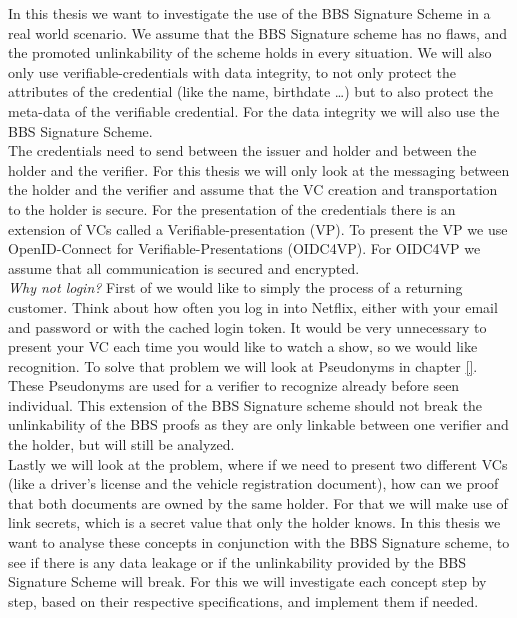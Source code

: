 \documentclass[
	a4paper               %
	,bibliography=totoc   %
	,listof=totoc         %
	,monolingual
]{bfhthesis}              %
\begin{document}
In this thesis we want to investigate the use of the BBS Signature Scheme in a real world scenario.
We assume that the BBS Signature scheme has no flaws, and the promoted unlinkability of the scheme holds in every situation.
We will also only use verifiable-credentials with data integrity, to not only protect the attributes of the credential (like the name, birthdate \dots) but to also protect the meta-data of the verifiable credential.
For the data integrity we will also use the BBS Signature Scheme.\\

The credentials need to send between the issuer and holder and between the holder and the verifier.
For this thesis we will only look at the messaging between the holder and the verifier and assume that the VC creation and transportation to the holder is secure.
For the presentation of the credentials there is an extension of VCs called a Verifiable-presentation (VP)\cite{verifiable-credentials}.
To present the VP we use OpenID-Connect for Verifiable-Presentations (OIDC4VP)\cite{oidc4vp}.
For OIDC4VP we assume that all communication is secured and encrypted.\\

\textit{Why not login?}
First of we would like to simply the process of a returning customer.
Think about how often you log in into Netflix, either with your email and password or with the cached login token.
It would be very unnecessary to present your VC each time you would like to watch a show, so we would like recognition.
To solve that problem we will look at Pseudonyms\cite{pseudonyms} in chapter \ref{}.\\

These Pseudonyms are used for a verifier to recognize already before seen individual.
This extension of the BBS Signature scheme should not break the unlinkability of the BBS proofs as they are only linkable between one verifier and the holder, but will still be analyzed.\\

Lastly we will look at the problem, where if we need to present two different VCs (like a driver's license and the vehicle registration document), how can we proof that both documents are owned by the same holder.
For that we will make use of link secrets\cite{linksecrets}, which is a secret value that only the holder knows.
In this thesis we want to analyse these concepts in conjunction with the BBS Signature scheme, to see if there is any data leakage or if the unlinkability provided by the BBS Signature Scheme will break.
For this we will investigate each concept step by step, based on their respective specifications, and implement them if needed.
\end{document}
